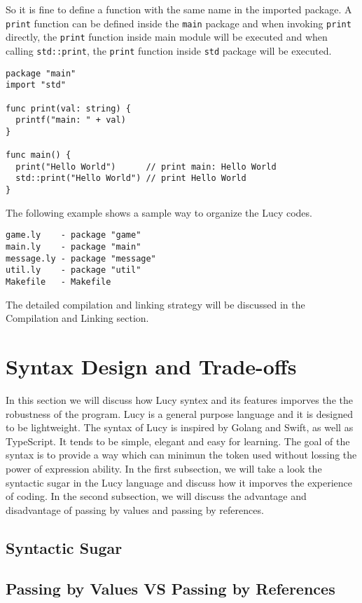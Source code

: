 So it is fine to define a function with the same name in the imported package. A \texttt{print} function can be defined inside the \texttt{main} package and when invoking \texttt{print} directly, the \texttt{print} function inside main module will be executed and when calling \texttt{std::print}, the \texttt{print} function inside \texttt{std} package will be executed.
\begin{lstlisting}
package "main"
import "std"

func print(val: string) {
  printf("main: " + val)
}

func main() {
  print("Hello World")      // print main: Hello World
  std::print("Hello World") // print Hello World
}
\end{lstlisting}
The following example shows a sample way to organize the Lucy codes.
\begin{lstlisting}
game.ly    - package "game"
main.ly    - package "main"
message.ly - package "message"
util.ly    - package "util"
Makefile   - Makefile
\end{lstlisting}
The detailed compilation and linking strategy will be discussed in the Compilation and Linking section.


\section{Syntax Design and Trade-offs}
In this section we will discuss how Lucy syntex and its features imporves the the robustness of the program. Lucy is a general purpose language and it is designed to be lightweight. The syntax of Lucy is inspired by Golang and Swift, as well as TypeScript. It tends to be simple, elegant and easy for learning. The goal of the syntax is to provide a way which can minimun the token used without lossing the power of expression ability.
\newline
In the first subsection, we will take a look the syntactic sugar in the Lucy language and discuss how it imporves the experience of coding. In the second subsection, we will discuss the advantage and disadvantage of passing by values and passing by references.

\subsection{Syntactic Sugar}


\subsection{Passing by Values VS Passing by References}


